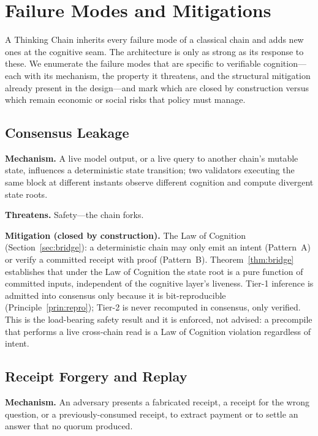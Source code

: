 \section{Failure Modes and Mitigations}
\label{sec:failures}

A Thinking Chain inherits every failure mode of a classical chain and adds new ones at the cognitive seam. The architecture is only as strong as its response to these. We enumerate the failure modes that are specific to verifiable cognition---each with its mechanism, the property it threatens, and the structural mitigation already present in the design---and mark which are closed by construction versus which remain economic or social risks that policy must manage.

\subsection{Consensus Leakage}

\textbf{Mechanism.} A live model output, or a live query to another chain's mutable state, influences a deterministic state transition; two validators executing the same block at different instants observe different cognition and compute divergent state roots.

\textbf{Threatens.} Safety---the chain forks.

\textbf{Mitigation (closed by construction).} The Law of Cognition (Section~\ref{sec:bridge}): a deterministic chain may only emit an intent (Pattern~A) or verify a committed receipt with proof (Pattern~B). Theorem~\ref{thm:bridge} establishes that under the Law of Cognition the state root is a pure function of committed inputs, independent of the cognitive layer's liveness. Tier-1 inference is admitted into consensus only because it is bit-reproducible (Principle~\ref{prin:repro}); Tier-2 is never recomputed in consensus, only verified. This is the load-bearing safety result and it is enforced, not advised: a precompile that performs a live cross-chain read is a Law of Cognition violation regardless of intent.

\subsection{Receipt Forgery and Replay}

\textbf{Mechanism.} An adversary presents a fabricated receipt, a receipt for the wrong question, or a previously-consumed receipt, to extract payment or to settle an answer that no quorum produced.

